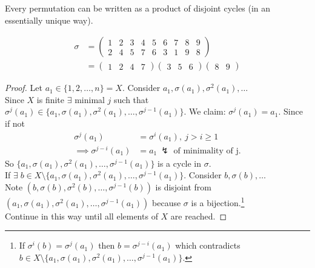 \begin{theorem}
\protect\hypertarget{thm:one}{}\label{thm:one}Every permutation can be written as a product of disjoint cycles (in an essentially unique way).
\end{theorem}

\begin{example}
\begin{align*}
    \sigma &= \begin{pmatrix}
    1 & 2 & 3 & 4 & 5 & 6 & 7 & 8 & 9 \\
    2 & 4 & 5 & 7 & 6 & 3 & 1 & 9 & 8
    \end{pmatrix} \\
    &= \begin{pmatrix} 1 & 2 & 4 & 7 \end{pmatrix} \begin{pmatrix}3 & 5 & 6\end{pmatrix} \begin{pmatrix}8 & 9\end{pmatrix}
\end{align*}
\end{example}

\begin{proof}
Let \(a_1 \in \{ 1, 2, \ldots, n \} = X\).
Consider \(a_1, \sigma(a_1), \sigma^2(a_1), \ldots\)\\
Since \(X\) is finite \(\exists\) minimal \(j\) such that \(\sigma^j(a_1) \in \{ a_1, \sigma(a_1), \sigma^2(a_1), \ldots, \sigma^{j-1}(a_1) \}\).
We claim: \(\sigma^j(a_1) = a_1\).
Since if not \begin{align*}
    \sigma^j(a_1) &= \sigma^i(a_1),\ j > i \geq 1 \\
    \implies \sigma^{j - i}(a_1) &= a_1 \ ↯ \text{ of minimality of j.}
\end{align*}
So \(\{ a_1, \sigma(a_1), \sigma^2(a_1), \ldots, \sigma^{j-1}(a_1) \}\) is a cycle in \(\sigma\).\\
If \(\exists \; b \in X \setminus \{ a_1, \sigma(a_1), \sigma^2(a_1), \ldots, \sigma^{j-1}(a_1) \}\).
Consider \(b, \sigma(b), \ldots\)\\
Note \(\left(b, \sigma(b), \sigma^2(b), \ldots, \sigma^{j-1}(b) \right)\) is disjoint from \(\left( a_1, \sigma(a_1), \sigma^2(a_1), \ldots, \sigma^{j-1}(a_1) \right)\) because \(\sigma\) is a bijection.\footnote{If \(\sigma^i(b) = \sigma^j(a_1)\) then \(b = \sigma^{j - i}(a_1)\) which contradicts \(b \in X \setminus \{ a_1, \sigma(a_1), \sigma^2(a_1), \ldots, \sigma^{j-1}(a_1) \}\).}\\
Continue in this way until all elements of \(X\) are reached.
\end{proof}

